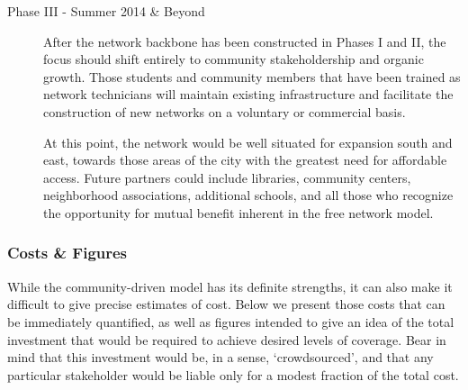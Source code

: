 \begin{description}
\item[Phase III - Summer 2014 \& Beyond]
After the network backbone has been constructed in Phases I and II, the
focus should shift entirely to community stakeholdership and organic growth.
Those students and community members that have been trained as network
technicians will maintain existing infrastructure and facilitate the
construction of new networks on a voluntary or commercial basis. \par
At this point, the network would be well situated for expansion south and east,
towards those areas of the city with the greatest need for affordable access.
Future partners could include libraries, community centers, neighborhood
associations, additional schools, and all those who recognize the opportunity
for mutual benefit inherent in the free network model.\par
\end{description}

\subsubsection{Costs \& Figures}
While the community-driven model has its definite strengths, it can also make it
difficult to give precise estimates of cost. Below we present
those costs that can be immediately quantified, as well as figures intended to
give an idea of the total investment that would be required to achieve desired
levels of coverage. Bear in mind that this investment would be, in a sense,
`crowdsourced', and that any particular stakeholder would be liable only for a
modest fraction of the total cost. \par

